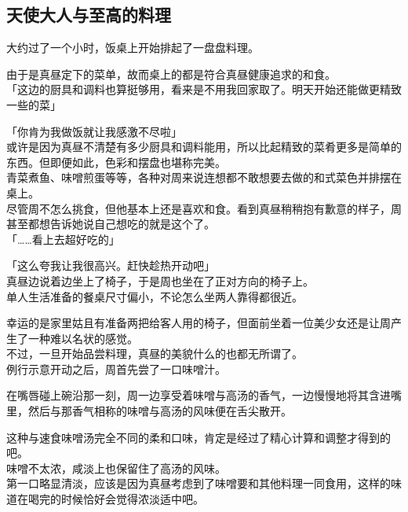 \subsection{天使大人与至高的料理}

大约过了一个小时，饭桌上开始排起了一盘盘料理。

由于是真昼定下的菜单，故而桌上的都是符合真昼健康追求的和食。\\

「这边的厨具和调料也算挺够用，看来是不用我回家取了。明天开始还能做更精致一些的菜」

「你肯为我做饭就让我感激不尽啦」\\

或许是因为真昼不清楚有多少厨具和调料能用，所以比起精致的菜肴更多是简单的东西。但即便如此，色彩和摆盘也堪称完美。\\

青菜煮鱼、味噌煎蛋等等，各种对周来说连想都不敢想要去做的和式菜色并排摆在桌上。\\

尽管周不怎么挑食，但他基本上还是喜欢和食。看到真昼稍稍抱有歉意的样子，周甚至都想告诉她说自己想吃的就是这个了。\\

「……看上去超好吃的」

「这么夸我让我很高兴。赶快趁热开动吧」\\

真昼边说着边坐上了椅子，于是周也坐在了正对方向的椅子上。\\

单人生活准备的餐桌尺寸偏小，不论怎么坐两人靠得都很近。

幸运的是家里姑且有准备两把给客人用的椅子，但面前坐着一位美少女还是让周产生了一种难以名状的感觉。\\

不过，一旦开始品尝料理，真昼的美貌什么的也都无所谓了。\\

例行示意开动之后，周首先尝了一口味噌汁。

在嘴唇碰上碗沿那一刻，周一边享受着味噌与高汤的香气，一边慢慢地将其含进嘴里，然后与那香气相称的味噌与高汤的风味便在舌尖散开。

这种与速食味噌汤完全不同的柔和口味，肯定是经过了精心计算和调整才得到的吧。\\

味噌不太浓，咸淡上也保留住了高汤的风味。\\

第一口略显清淡，应该是因为真昼考虑到了味噌要和其他料理一同食用，这样的味道在喝完的时候恰好会觉得浓淡适中吧。\\

